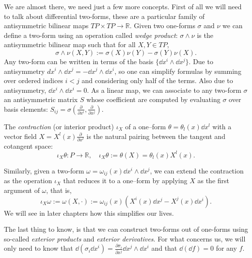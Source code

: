 \documentclass[english,fontsize=11pt,paper=b5]{scrbook}
\numberwithin{equation}{chapter}
\theoremstyle{definition}
\begin{document}
    We are almost there, we need just a few more concepts.
    First of all we will need to talk about differential two-forms, these are a particular family of antisymmetric bilinear maps $TP \times TP \to \mathbb{R}$.
    Given two one-forms $\sigma$ and $\nu$ we can define a two-form using an operation called \emph{wedge product}: $\sigma\wedge\nu$ is the antisymmetric bilinear map such that for all $X,Y \in TP$,
    \begin{equation}
      \sigma\wedge\nu(X,Y) := \sigma(X)\nu(Y) - \sigma(Y)\nu(X).
    \end{equation}
    Any two-form can be written in terms of the basis $\{\dd x^i\wedge \dd x^j\}$. Due to antisymmetry $dx^i \wedge \dd x^j = - \dd x^j \wedge \dd x^i$, so one can simplify formulas by summing over ordered indices $i<j$ and considering only half of the terms. Also due to antisymmetry, $\dd x^i \wedge \dd x^i = 0$. As a linear map, we can associate to any two-form $\sigma$ an antisymmetric matrix $S$ whose coefficient are computed by evaluating $\sigma$ over basis elements: $S_{ij} = \sigma\left(\frac{\partial}{\partial x^i}, \frac{\partial}{\partial x^j}\right)$.

    The \emph{contraction} (or interior product) $\iota_X$ of a one--form $\theta = \theta_l(x)\dd x^l$ with a vector field $X = X^l(x)\frac{\partial}{\partial x^l}$ is the natural pairing between the tangent and cotangent space:
    \begin{equation}
      \iota_X \theta : P \to \mathbb{R}, \quad \iota_X \theta := \theta(X) = \theta_l(x) X^l(x).
    \end{equation}

    Similarly, given a two-form $\omega = \omega_{ij}(x) \dd x^i\wedge \dd x^j$, we can extend the contraction as the operation $\iota_X$ that reduces it to a one--form by applying $X$ as the first argument of $\omega$, that is,
    \begin{equation}\label{eq:contraction}
      \iota_X \omega := \omega(X, \cdot) := \omega_{ij}(x)(X^i(x) \dd x^j - X^j(x) \dd x^i).
    \end{equation}
    We will see in later chapters how this simplifies our lives.

    The last thing to know, is that we can construct two-forms out of one-forms using so-called \emph{exterior products} and \emph{exterior derivatives}.
    For what concerns us, we will only need to know that $\dd (\sigma_i \dd x^i) = \frac{\partial \sigma_i}{\partial x^j} \dd x^j \wedge \dd x^i$ and that $\dd (\dd f) = 0$ for any $f$.
\end{document}
